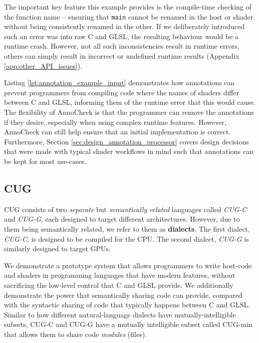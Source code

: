 \documentclass[a4paper,12pt,twoside,openright]{report}
\begin{document}
The important key feature this example provides is the compile-time checking of
the function name -- ensuring that \texttt{main} cannot be renamed in the host
or shader without being consistently renamed in the other. If we deliberately
introduced such an error was into raw C and GLSL, the resulting behaviour would
be a runtime crash. However, not all such inconsistencies result in runtime
errors, others can simply result in incorrect or undefined runtime results
(Appendix \ref{app:other_API_issues}).

Listing \ref{lst:annotation_example_input} demonstrates how annotations can
prevent programmers from compiling code where the names of shaders differ
between C and GLSL, informing them of the runtime error that this would cause.
The flexibility of AnnoCheck is that the programmer can remove the annotations
if they desire, especially when using complex runtime features. However,
AnnoCheck can still help ensure that an initial implementation is correct.
Furthermore, Section \ref{sec:design_annotation_processor} covers design
decisions that were made with typical shader workflows in mind such that
annotations can be kept for most use-cases.

\subsection{CUG}

CUG consists of two \textit{separate} but \textit{semantically related}
languages called \textit{CUG-C} and \textit{CUG-G}, each designed to target
different architectures. However, due to them being semantically related, we
refer to them as \textbf{dialects}. The first dialect, \textit{CUG-C}, is
designed to be compiled for the CPU. The second dialect, \textit{CUG-G} is
similarly designed to target GPUs.

We demonstrate a prototype system that allows programmers to write host-code
and shaders in programming languages that have modern features, without
sacrificing the low-level control that C and GLSL provide. We additionally
demonstrate the power that semantically sharing code can provide, compared with
the syntactic sharing of code that typically happens between C and GLSL.
Similar to how different natural-language dialects have mutually-intelligible
subsets, CUG-C and CUG-G have a mutually intelligible subset called CUG-min
that allows them to share code \textit{modules} (files).

\end{document}
